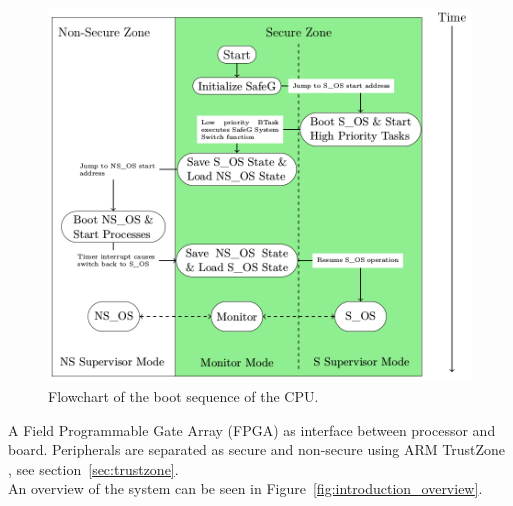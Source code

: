 \begin{figure}[H]
\centering
\includegraphics[width=\textwidth]{./img/literature_modeswitch.png}
\caption{Flowchart of the boot sequence of the CPU. \cite{zaki2016}}\label{fig:modeswitch}
\end{figure}

A Field Programmable Gate Array (FPGA) as interface between processor and board. Peripherals are separated as secure and non-secure using ARM TrustZone \cite{website:ARM}, see section~\ref{sec:trustzone}. \\ %

An overview of the system can be seen in Figure~\ref{fig:introduction_overview}.

